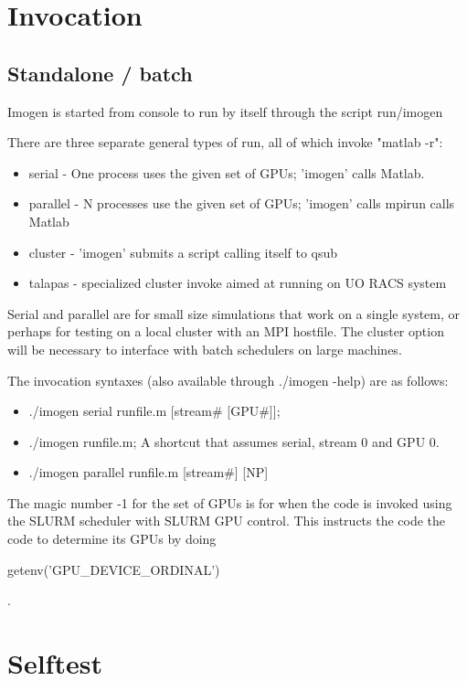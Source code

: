 \documentclass[letterpaper,12pt]{article}
\begin{document}
\section{Invocation}

\subsection{Standalone / batch}

Imogen is started from console to run by itself through the script run/imogen

There are three separate general types of run, all of which invoke "matlab -r":
\begin{itemize}
\item serial - One process uses the given set of GPUs; 'imogen' calls Matlab.
\item parallel - N processes use the given set of GPUs; 'imogen' calls mpirun calls Matlab
\item cluster - 'imogen' submits a script calling itself to qsub
\item talapas - specialized cluster invoke aimed at running on UO RACS system
\end{itemize}

Serial and parallel are for small size simulations that work on a single system,
or perhaps for testing on a local cluster with an MPI hostfile.
The cluster option will be necessary to interface with batch schedulers on large machines.

The invocation syntaxes (also available through ./imogen -help) are as follows:
\begin{itemize}
\item ./imogen serial runfile.m [stream\# [GPU\#]];
\item ./imogen runfile.m; A shortcut that assumes serial, stream 0 and GPU 0.
\item ./imogen parallel runfile.m [stream\#] [NP]
\end{itemize}

The magic number -1 for the set of GPUs is for when the code is invoked using the SLURM 
scheduler with SLURM GPU control. This instructs the code the code to determine its GPUs
by doing \begin{tt}getenv('GPU\_DEVICE\_ORDINAL')\end{tt}.

\section{Selftest}
\end{document}
